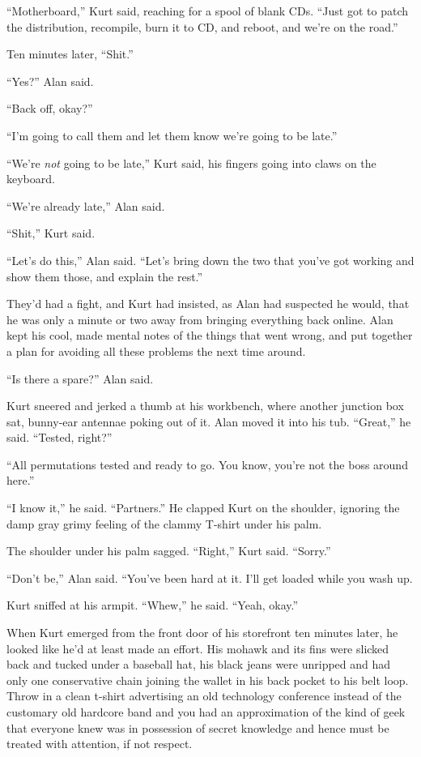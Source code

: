 \documentclass{article}
\begin{document}
``Motherboard,'' Kurt said, reaching for a spool of blank CDs.  ``Just
got to patch the distribution, recompile, burn it to CD, and reboot,
and we're on the road.''

Ten minutes later, ``Shit.''

``Yes?'' Alan said.

``Back off, okay?''

``I'm going to call them and let them know we're going to be late.''

``We're \textit{not} going to be late,'' Kurt said, his fingers going
into claws on the keyboard.

``We're already late,'' Alan said.

``Shit,'' Kurt said.

``Let's do this,'' Alan said.  ``Let's bring down the two that you've
got working and show them those, and explain the rest.''

They'd had a fight, and Kurt had insisted, as Alan had suspected he
would, that he was only a minute or two away from bringing everything
back online.  Alan kept his cool, made mental notes of the things that
went wrong, and put together a plan for avoiding all these problems
the next time around.

``Is there a spare?'' Alan said.

Kurt sneered and jerked a thumb at his workbench, where another
junction box sat, bunny-ear antennae poking out of it.  Alan moved it
into his tub.  ``Great,'' he said.  ``Tested, right?''

``All permutations tested and ready to go.  You know, you're not the
boss around here.''

``I know it,'' he said.  ``Partners.'' He clapped Kurt on the
shoulder, ignoring the damp gray grimy feeling of the clammy T-shirt
under his palm.

The shoulder under his palm sagged.  ``Right,'' Kurt said.  ``Sorry.''

``Don't be,'' Alan said.  ``You've been hard at it.  I'll get loaded
while you wash up.

Kurt sniffed at his armpit.  ``Whew,'' he said.  ``Yeah, okay.''

When Kurt emerged from the front door of his storefront ten minutes
later, he looked like he'd at least made an effort.  His mohawk and
its fins were slicked back and tucked under a baseball hat, his black
jeans were unripped and had only one conservative chain joining the
wallet in his back pocket to his belt loop.  Throw in a clean t-shirt
advertising an old technology conference instead of the customary old
hardcore band and you had an approximation of the kind of geek that
everyone knew was in possession of secret knowledge and hence must be
treated with attention, if not respect.
\end{document}
